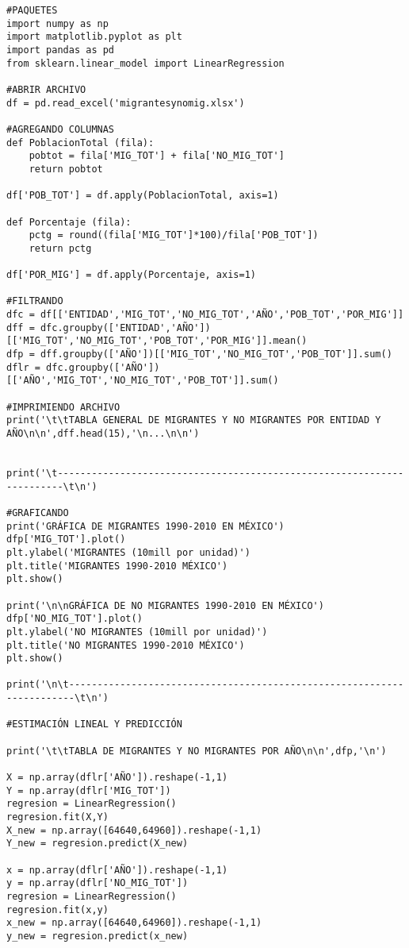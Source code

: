 \documentclass[12pt]{article}
\begin{document}
\begin{verbatim}
#PAQUETES
import numpy as np
import matplotlib.pyplot as plt 
import pandas as pd
from sklearn.linear_model import LinearRegression

#ABRIR ARCHIVO
df = pd.read_excel('migrantesynomig.xlsx')

#AGREGANDO COLUMNAS
def PoblacionTotal (fila):
    pobtot = fila['MIG_TOT'] + fila['NO_MIG_TOT']
    return pobtot

df['POB_TOT'] = df.apply(PoblacionTotal, axis=1)

def Porcentaje (fila):
    pctg = round((fila['MIG_TOT']*100)/fila['POB_TOT'])
    return pctg

df['POR_MIG'] = df.apply(Porcentaje, axis=1)

#FILTRANDO
dfc = df[['ENTIDAD','MIG_TOT','NO_MIG_TOT','AÑO','POB_TOT','POR_MIG']]
dff = dfc.groupby(['ENTIDAD','AÑO'])[['MIG_TOT','NO_MIG_TOT','POB_TOT','POR_MIG']].mean()
dfp = dff.groupby(['AÑO'])[['MIG_TOT','NO_MIG_TOT','POB_TOT']].sum()
dflr = dfc.groupby(['AÑO'])[['AÑO','MIG_TOT','NO_MIG_TOT','POB_TOT']].sum()
 
#IMPRIMIENDO ARCHIVO
print('\t\tTABLA GENERAL DE MIGRANTES Y NO MIGRANTES POR ENTIDAD Y AÑO\n\n',dff.head(15),'\n...\n\n')


print('\t-----------------------------------------------------------------------\t\n')

#GRAFICANDO
print('GRÁFICA DE MIGRANTES 1990-2010 EN MÉXICO')
dfp['MIG_TOT'].plot()
plt.ylabel('MIGRANTES (10mill por unidad)')
plt.title('MIGRANTES 1990-2010 MÉXICO')
plt.show()

print('\n\nGRÁFICA DE NO MIGRANTES 1990-2010 EN MÉXICO')
dfp['NO_MIG_TOT'].plot()
plt.ylabel('NO MIGRANTES (10mill por unidad)')
plt.title('NO MIGRANTES 1990-2010 MÉXICO')
plt.show()

print('\n\t-----------------------------------------------------------------------\t\n')

#ESTIMACIÓN LINEAL Y PREDICCIÓN

print('\t\tTABLA DE MIGRANTES Y NO MIGRANTES POR AÑO\n\n',dfp,'\n')

X = np.array(dflr['AÑO']).reshape(-1,1)
Y = np.array(dflr['MIG_TOT'])
regresion = LinearRegression()
regresion.fit(X,Y)
X_new = np.array([64640,64960]).reshape(-1,1)
Y_new = regresion.predict(X_new)

x = np.array(dflr['AÑO']).reshape(-1,1)
y = np.array(dflr['NO_MIG_TOT'])
regresion = LinearRegression()
regresion.fit(x,y)
x_new = np.array([64640,64960]).reshape(-1,1)
y_new = regresion.predict(x_new)


\end{verbatim}
\end{document}
